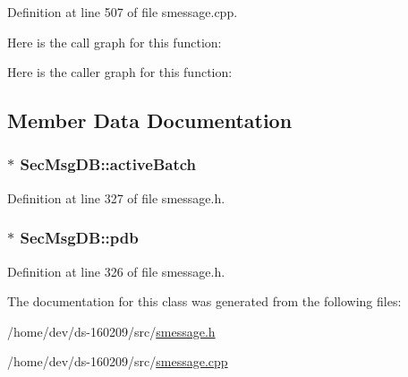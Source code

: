 Definition at line 507 of file smessage.\+cpp.



Here is the call graph for this function\+:




Here is the caller graph for this function\+:




\subsection{Member Data Documentation}
\hypertarget{class_sec_msg_d_b_add6d2066ed0af0b4fcaef2739663e2c4}{}
\subsubsection[{active\+Batch}]{$\ast$ Sec\+Msg\+D\+B\+::active\+Batch}\label{class_sec_msg_d_b_add6d2066ed0af0b4fcaef2739663e2c4}


Definition at line 327 of file smessage.\+h.

\hypertarget{class_sec_msg_d_b_a3715bf85e5e420c6c3ec5335bec80ed0}{}
\subsubsection[{pdb}]{$\ast$ Sec\+Msg\+D\+B\+::pdb}\label{class_sec_msg_d_b_a3715bf85e5e420c6c3ec5335bec80ed0}


Definition at line 326 of file smessage.\+h.



The documentation for this class was generated from the following files\+:\begin{DoxyCompactItemize}
\item 
/home/dev/ds-\/160209/src/\hyperlink{smessage_8h}{smessage.\+h}\item 
/home/dev/ds-\/160209/src/\hyperlink{smessage_8cpp}{smessage.\+cpp}\end{DoxyCompactItemize}
